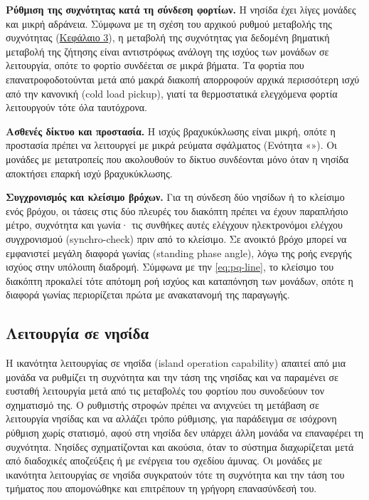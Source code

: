 \textbf{Ρύθμιση της συχνότητας κατά τη σύνδεση φορτίων.} Η νησίδα έχει λίγες μονάδες και μικρή
αδράνεια. Σύμφωνα με τη σχέση του αρχικού ρυθμού μεταβολής της συχνότητας
(\hyperref[kef-03-theoria]{Κεφάλαιο 3}), η μεταβολή της συχνότητας για δεδομένη βηματική
μεταβολή της ζήτησης είναι αντιστρόφως ανάλογη της ισχύος των μονάδων σε λειτουργία, οπότε το
φορτίο συνδέεται σε μικρά βήματα. Τα φορτία που επανατροφοδοτούνται μετά από μακρά διακοπή
απορροφούν αρχικά περισσότερη ισχύ από την κανονική (cold load pickup), γιατί τα θερμοστατικά
ελεγχόμενα φορτία λειτουργούν τότε όλα ταυτόχρονα.

\textbf{Ασθενές δίκτυο και προστασία.} Η ισχύς βραχυκύκλωσης είναι μικρή, οπότε η προστασία
πρέπει να λειτουργεί με μικρά ρεύματα σφάλματος (Ενότητα «»). Οι μονάδες με
μετατροπείς που ακολουθούν το δίκτυο συνδέονται μόνο όταν η νησίδα αποκτήσει επαρκή ισχύ
βραχυκύκλωσης.

\textbf{Συγχρονισμός και κλείσιμο βρόχων.} Για τη σύνδεση δύο νησίδων ή το κλείσιμο ενός
βρόχου, οι τάσεις στις δύο πλευρές του διακόπτη πρέπει να έχουν παραπλήσιο μέτρο, συχνότητα και
γωνία· τις συνθήκες αυτές ελέγχουν ηλεκτρονόμοι ελέγχου συγχρονισμού (synchro-check) πριν από
το κλείσιμο. Σε ανοικτό βρόχο μπορεί να εμφανιστεί μεγάλη διαφορά γωνίας (standing phase
angle), λόγω της ροής ενεργής ισχύος στην υπόλοιπη διαδρομή. Σύμφωνα με την
\eqref{eq:pq-line}, το κλείσιμο του διακόπτη προκαλεί τότε απότομη ροή ισχύος και καταπόνηση
των μονάδων, οπότε η διαφορά γωνίας περιορίζεται πρώτα με ανακατανομή της παραγωγής.

\subsection{Λειτουργία σε νησίδα}
\label{sec:island}

Η ικανότητα λειτουργίας σε νησίδα (island operation capability) απαιτεί από μια μονάδα να
ρυθμίζει τη συχνότητα και την τάση της νησίδας και να παραμένει σε ευσταθή λειτουργία μετά από
τις μεταβολές του φορτίου που συνοδεύουν τον σχηματισμό της. Ο ρυθμιστής στροφών πρέπει να
ανιχνεύει τη μετάβαση σε λειτουργία νησίδας και να αλλάζει τρόπο ρύθμισης, για παράδειγμα σε
ισόχρονη ρύθμιση χωρίς στατισμό, αφού στη νησίδα δεν υπάρχει άλλη μονάδα να επαναφέρει τη
συχνότητα. Νησίδες σχηματίζονται και ακούσια, όταν το σύστημα διαχωρίζεται μετά από διαδοχικές
αποζεύξεις ή με ενέργεια του σχεδίου άμυνας. Οι μονάδες με ικανότητα λειτουργίας σε νησίδα
συγκρατούν τότε τη συχνότητα και την τάση του τμήματος που απομονώθηκε και επιτρέπουν τη
γρήγορη επανασύνδεσή του.

